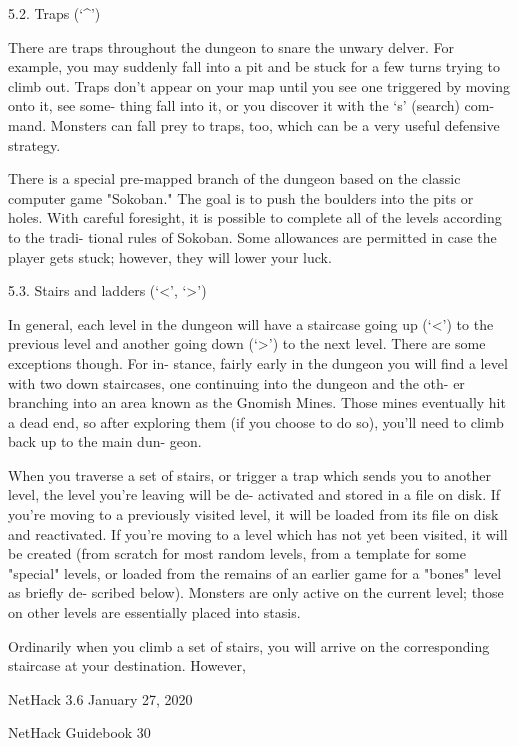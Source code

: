 \documentclass[11pt]{article}
\begin{document}
5.2. Traps (`\^{}')

   There are traps throughout the dungeon to snare the unwary
delver. For example, you may suddenly fall into a pit and be
stuck for a few turns trying to climb out. Traps don't appear on
your map until you see one triggered by moving onto it, see some-
thing fall into it, or you discover it with the `s' (search) com-
mand. Monsters can fall prey to traps, too, which can be a very
useful defensive strategy.

   There is a special pre-mapped branch of the dungeon based on
the classic computer game "Sokoban." The goal is to push the
boulders into the pits or holes. With careful foresight, it is
possible to complete all of the levels according to the tradi-
tional rules of Sokoban. Some allowances are permitted in case
the player gets stuck; however, they will lower your luck.

5.3. Stairs and ladders (`<', `>')

   In general, each level in the dungeon will have a staircase
going up (`<') to the previous level and another going down (`>')
to the next level. There are some exceptions though.  For in-
stance, fairly early in the dungeon you will find a level with
two down staircases, one continuing into the dungeon and the oth-
er branching into an area known as the Gnomish Mines. Those
mines eventually hit a dead end, so after exploring them (if you
choose to do so), you'll need to climb back up to the main dun-
geon.

   When you traverse a set of stairs, or trigger a trap which
sends you to another level, the level you're leaving will be de-
activated and stored in a file on disk. If you're moving to a
previously visited level, it will be loaded from its file on disk
and reactivated. If you're moving to a level which has not yet
been visited, it will be created (from scratch for most random
levels, from a template for some "special" levels, or loaded from
the remains of an earlier game for a "bones" level as briefly de-
scribed below). Monsters are only active on the current level;
those on other levels are essentially placed into stasis.

   Ordinarily when you climb a set of stairs, you will arrive
on the corresponding staircase at your destination.  However,


NetHack 3.6                   January 27, 2020





NetHack Guidebook                       30
\end{document}
